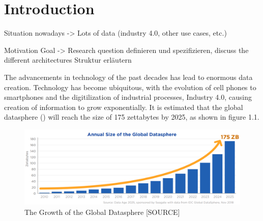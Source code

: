 \chapter{Introduction}
\label{cha:Introduction} %
Situation nowadays -> Lots of data (industry 4.0, other use cases, etc.)

Motivation
Goal -> Research question definieren und spezifizieren, discuss the different architectures
Struktur erläutern


The advancements in technology of the past decades has lead to enormous data creation. Technology has become ubiquitous, 
with the evolution of cell phones to smartphones 
and the digitilization of industrial processes, Industry 4.0, causing creation of information to grow exponentially.
It is estimated that the global datasphere () will reach the size of 175 zettabytes by 2025, as shown in figure 1.1.
\begin{figure}[ht]
\centering
\includegraphics[width=1.0\textwidth]{Bilder/size_global_datasphere.png}
\caption{The Growth of the Global Datasphere [SOURCE]}
\label{fig:growth_datasphere}
\end{figure}

